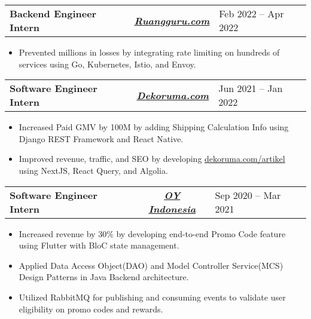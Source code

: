 \documentclass[letterpaper,11pt]{article}
\makeatletter
\newcommand{\resumeItem}[1]{
  \item\small{
    {#1 \vspace{-3pt} }
  }
}
\newcommand{\resumeSubheading}[4]{
  \vspace{-2pt}\item

    \begin{tabularx}{\textwidth}{X c >{\raggedleft}X}

        \textbf{#1} & \textit{\textbf{#3}} & #2
    \end{tabularx}\vspace{-7pt}
}
\newcommand{\resumeSubSubheading}[2]{
    \item
    \begin{tabular*}{\textwidth}{l@{\extracolsep{\fill}}r}
      \textit{\small#1} & \textit{\small #2} \\
    \end{tabular*}\vspace{-7pt}
}
\newcommand{\resumeSubHeadingListEnd}{\end{itemize}}
\newcommand{\resumeItemListStart}{\begin{itemize}[leftmargin=0.15in]}
\newcommand{\resumeItemListEnd}{\end{itemize}\vspace{-5pt}}
\makeatother
\begin{document}
    \resumeSubheading
      {Backend Engineer Intern} {Feb 2022 -- Apr 2022}
      {\href{https://www.ruangguru.com/}{Ruangguru.com}}{Jakarta, Indonesia}
      \resumeItemListStart
        \resumeItem{Prevented millions in losses by integrating rate limiting on hundreds of services using Go, Kubernetes, Istio, and Envoy.}
      \resumeItemListEnd

    \resumeSubheading
      {Software Engineer Intern} {Jun 2021 -- Jan 2022}
      {\href{https://dekoruma.com}{Dekoruma.com}}{Jakarta, Indonesia}
      \resumeItemListStart
        \resumeItem{Increased Paid GMV by 100M by adding Shipping Calculation Info using Django REST Framework and React Native.}
        \resumeItem{Improved revenue, traffic, and SEO by developing {\href{https://dekoruma.com/artikel}{dekoruma.com/artikel}} using NextJS, React Query, and Algolia.}
      \resumeItemListEnd


      
    \resumeSubheading
      {Software Engineer Intern} {Sep 2020 -- Mar 2021}
      {\href{https://oyindonesia.com}{OY Indonesia}}{Jakarta, Indonesia}
      \resumeItemListStart
        \resumeItem{Increased revenue by 30\% by developing end-to-end Promo Code feature using Flutter with BloC state management.}
        \resumeItem{Applied Data Access Object(DAO) and Model Controller Service(MCS) Design Patterns in Java Backend architecture.}
        \resumeItem{Utilized RabbitMQ for publishing and consuming events to validate user eligibility on promo codes and rewards.}
      \resumeItemListEnd
      
\end{document}
